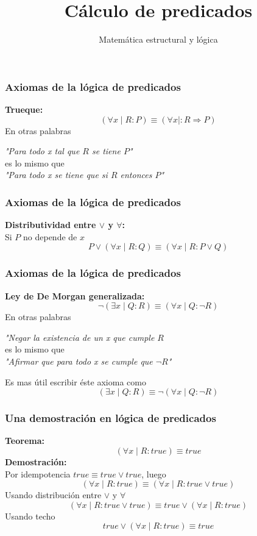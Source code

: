 \documentclass{beamer}
\title{Cálculo de predicados}
\author{Matemática estructural y lógica}
\institute{ISIS-1104}
\date{}
\newcommand{\then}{\Rightarrow}
\begin{document}
\frame{\titlepage}

\begin{frame}[fragile]
    \frametitle{Axiomas de la lógica de predicados}
    \pause
    \textbf{Trueque:}
    $$(\forall x \mid R : P) \equiv (\forall x \mid : R \then P)$$
    \pause
    En otras palabras
    \begin{center}
        \textit{"Para todo x tal que $R$ se tiene $P$"} \\
        es lo mismo que \\
        \textit{"Para todo x se tiene que si $R$ entonces $P$"}
    \end{center}
\end{frame}

\begin{frame}[fragile]
    \frametitle{Axiomas de la lógica de predicados}
    \pause
    \textbf{Distributividad entre $\lor$ y $\forall$:} \\
    Si $P$ no depende de $x$
    $$P \lor (\forall x \mid R : Q) \equiv (\forall x \mid R : P \lor Q)$$
\end{frame}

\begin{frame}[fragile]
    \frametitle{Axiomas de la lógica de predicados}
    \pause
    \textbf{Ley de De Morgan generalizada:} \\
    $$\lnot (\exists x \mid Q : R) \equiv (\forall x \mid Q : \lnot R)$$
    \pause
    En otras palabras
    \begin{center}
        \textit{"Negar la existencia de un x que cumple $R$} \\
        es lo mismo que \\
        \textit{"Afirmar que para todo x se cumple que $\lnot R$"}
    \end{center}
    \pause
    Es mas útil escribir éste axioma como
    $$(\exists x \mid Q : R) \equiv \lnot (\forall x \mid Q : \lnot R)$$
\end{frame}

\begin{frame}[fragile]
    \frametitle{Una demostración en lógica de predicados}
    \pause
    \textbf{Teorema:}
    $$(\forall x \mid R : true) \equiv true$$
    \pause
    \textbf{Demostración:} \\
    \pause
    Por idempotencia $true \equiv true \lor true$, luego
    $$(\forall x \mid R : true) \equiv (\forall x \mid R : true \lor true)$$
    \pause
    Usando distribución entre $\lor$ y $\forall$
    $$(\forall x \mid R : true \lor true) \equiv true \lor (\forall x \mid R : true)$$
    \pause
    Usando techo
    $$true \lor (\forall x \mid R : true) \equiv true$$
\end{frame}
\end{document}
